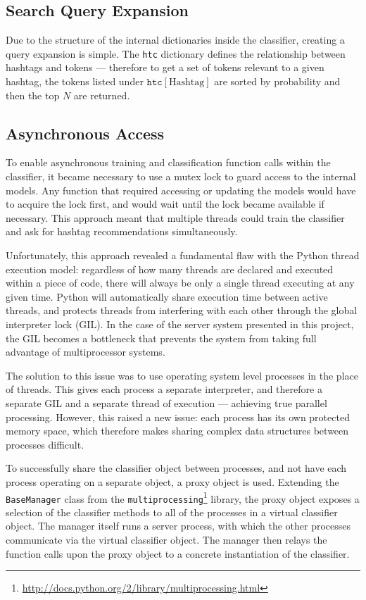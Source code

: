 \documentclass[11pt,a4paper]{report}
\begin{document}
\subsection{Search Query Expansion}
Due to the structure of the internal dictionaries inside the classifier, creating a query expansion is simple. The \texttt{htc} dictionary defines the relationship between hashtags and tokens --- therefore to get a set of tokens relevant to a given hashtag, the tokens listed under $\mathtt{htc}[\text{Hashtag}]$ are sorted by probability and then the top $N$ are returned.

\subsection{Asynchronous Access}
To enable asynchronous training and classification function calls within the classifier, it became necessary to use a mutex lock to guard access to the internal models. Any function that required accessing or updating the models would have to acquire the lock first, and would wait until the lock became available if necessary. This approach meant that multiple threads could train the classifier and ask for hashtag recommendations simultaneously.

Unfortunately, this approach revealed a fundamental flaw with the Python thread execution model: regardless of how many threads are declared and executed within a piece of code, there will always be only a single thread executing at any given time. Python will automatically share execution time between active threads, and protects threads from interfering with each other through the global interpreter lock (GIL). In the case of the server system presented in this project, the GIL becomes a bottleneck that prevents the system from taking full advantage of multiprocessor systems.

The solution to this issue was to use operating system level processes in the place of threads. This gives each process a separate interpreter, and therefore a separate GIL and a separate thread of execution --- achieving true parallel processing. However, this raised a new issue: each process has its own protected memory space, which therefore makes sharing complex data structures between processes difficult.

To successfully share the classifier object between processes, and not have each process operating on a separate object, a proxy object is used. Extending the \texttt{BaseManager} class from the \texttt{multiprocessing}\footnote{\url{http://docs.python.org/2/library/multiprocessing.html}} library, the proxy object exposes a selection of the classifier methods to all of the processes in a virtual classifier object. The manager itself runs a server process, with which the other processes communicate via the virtual classifier object. The manager then relays the function calls upon the proxy object to a concrete instantiation of the classifier.
\end{document}

